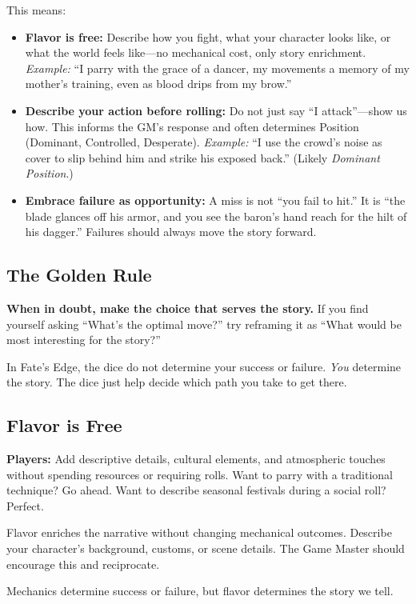 This means:
\begin{itemize}
\item \textbf{Flavor is free:} Describe how you fight, what your character looks like, or what the world feels like—no mechanical cost, only story enrichment.  
\emph{Example:} “I parry with the grace of a dancer, my movements a memory of my mother’s training, even as blood drips from my brow.”

\item \textbf{Describe your action before rolling:} Do not just say “I attack”—show us how. This informs the GM’s response and often determines Position (Dominant, Controlled, Desperate).  
\emph{Example:} “I use the crowd’s noise as cover to slip behind him and strike his exposed back.” (Likely \textit{Dominant Position}.)

\item \textbf{Embrace failure as opportunity:} A miss is not “you fail to hit.” It is “the blade glances off his armor, and you see the baron’s hand reach for the hilt of his dagger.” Failures should always move the story forward.
\end{itemize}

\subsection{The Golden Rule}

\textbf{When in doubt, make the choice that serves the story.} If you find yourself asking “What’s the optimal move?” try reframing it as “What would be most interesting for the story?”

\begin{tcolorbox}[colback=black!3!white, colframe=black!40!white, title=Remember, fonttitle=\bfseries]
In Fate's Edge, the dice do not determine your success or failure. \textit{You} determine the story. The dice just help decide which path you take to get there.
\end{tcolorbox}

\subsection{Flavor is Free}

\begin{tcolorbox}[colback=gray!5!white, colframe=gray!75!black, title=Flavor is Free, fonttitle=\bfseries]

\textbf{Players:} Add descriptive details, cultural elements, and atmospheric touches without spending resources or requiring rolls. Want to parry with a traditional technique? Go ahead. Want to describe seasonal festivals during a social roll? Perfect.

Flavor enriches the narrative without changing mechanical outcomes. Describe your character’s background, customs, or scene details. The Game Master should encourage this and reciprocate.

Mechanics determine success or failure, but flavor determines the story we tell.
\end{tcolorbox}

